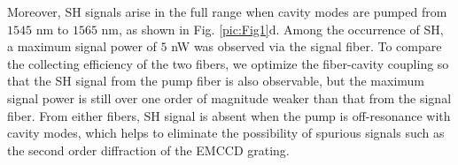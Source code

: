 \documentclass[a4paper,8pt,hyperref, twocolumn]{article}
\begin{document}
Moreover, SH signals arise in the full range when cavity modes are pumped from $1545$ nm to $1565$ nm, as shown in Fig. \ref{pic:Fig1}d.
Among the occurrence of SH, a maximum signal power of $5$ nW was observed via the signal fiber. To compare the collecting efficiency of the two fibers, we optimize the fiber-cavity coupling so that the SH signal from the pump fiber is also observable, but the maximum signal power is still over one order of magnitude weaker than that from the signal fiber. From either fibers, SH signal is absent when the pump is off-resonance with cavity modes, which helps to eliminate the possibility of spurious signals such as the second order diffraction of the EMCCD grating.

\end{document}
